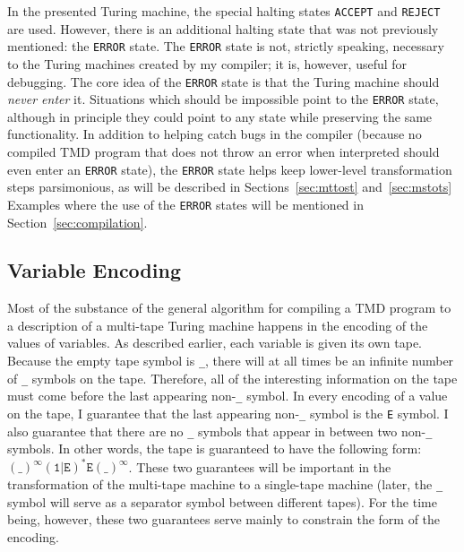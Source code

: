 \documentclass{report}
\begin{document}
In the presented Turing machine, the special halting states \texttt{ACCEPT} and \texttt{REJECT} are used. However, there is an additional halting state that was not previously mentioned: the \texttt{ERROR} state. The \texttt{ERROR} state is not, strictly speaking, necessary to the Turing machines created by my compiler; it is, however, useful for debugging. The core idea of the \texttt{ERROR} state is that the Turing machine should \emph{never enter} it. Situations which should be impossible point to the \texttt{ERROR} state, although in principle they could point to any state while preserving the same functionality. In addition to helping catch bugs in the compiler (because no compiled TMD program that does not throw an error when interpreted should even enter an \texttt{ERROR} state), the \texttt{ERROR} state helps keep lower-level transformation steps parsimonious, as will be described in Sections~\ref{sec:mttost} and~\ref{sec:mstots} Examples where the use of the \texttt{ERROR} states will be mentioned in Section~\ref{sec:compilation}. \\

\subsection{Variable Encoding}

Most of the substance of the general algorithm for compiling a TMD program to a description of a multi-tape Turing machine happens in the encoding of the values of variables. As described earlier, each variable is given its own tape. \\

Because the empty tape symbol is \texttt{\_}, there will at all times be an infinite number of \texttt{\_} symbols on the tape. Therefore, all of the interesting information on the tape must come before the last appearing non-\texttt{\_} symbol. In every encoding of a value on the tape, I guarantee that the last appearing non-\texttt{\_} symbol is the \texttt{E} symbol. I also guarantee that there are no \texttt{\_} symbols that appear in between two non-\texttt{\_} symbols. In other words, the tape is guaranteed to have the following form: $(\texttt{\_})^\infty(\texttt{1}|\texttt{E})^*\texttt{E}(\texttt{\_})^\infty$. These two guarantees will be important in the transformation of the multi-tape machine to a single-tape machine (later, the \texttt{\_} symbol will serve as a separator symbol between different tapes). For the time being, however, these two guarantees serve mainly to constrain the form of the encoding. \\
\end{document}
